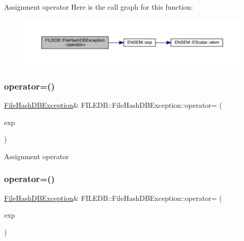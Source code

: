 Assignment operator Here is the call graph for this function\+:
\nopagebreak
\begin{figure}[H]
\begin{center}
\leavevmode
\includegraphics[width=350pt]{db/dfa/classFILEDB_1_1FileHashDBException_a82f111a87cc81fef84c32f76ebbd15d7_cgraph}
\end{center}
\end{figure}
\mbox{\label{classFILEDB_1_1FileHashDBException_ac7678441c40ae0bf44d1156dbabd596a}} 
\subsubsection{\texorpdfstring{operator=()}{operator=()}\hspace{0.1cm}{\footnotesize\ttfamily [2/3]}}
{\footnotesize\ttfamily \mbox{\hyperlink{classFILEDB_1_1FileHashDBException}{File\+Hash\+D\+B\+Exception}}\& F\+I\+L\+E\+D\+B\+::\+File\+Hash\+D\+B\+Exception\+::operator= (\begin{DoxyParamCaption}\item[{const \mbox{\hyperlink{classFILEDB_1_1FileHashDBException}{File\+Hash\+D\+B\+Exception}} \&}]{exp }\end{DoxyParamCaption})}

Assignment operator \mbox{\label{classFILEDB_1_1FileHashDBException_ac7678441c40ae0bf44d1156dbabd596a}} 
\subsubsection{\texorpdfstring{operator=()}{operator=()}\hspace{0.1cm}{\footnotesize\ttfamily [3/3]}}
{\footnotesize\ttfamily \mbox{\hyperlink{classFILEDB_1_1FileHashDBException}{File\+Hash\+D\+B\+Exception}}\& F\+I\+L\+E\+D\+B\+::\+File\+Hash\+D\+B\+Exception\+::operator= (\begin{DoxyParamCaption}\item[{const \mbox{\hyperlink{classFILEDB_1_1FileHashDBException}{File\+Hash\+D\+B\+Exception}} \&}]{exp }\end{DoxyParamCaption})}

